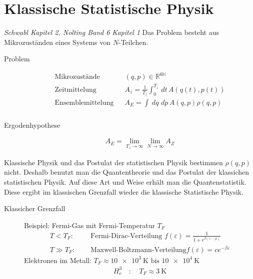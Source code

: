 \documentclass[11pt]{article}
\theoremstyle{plain}
\theoremstyle{mytheoremstyle}
\newcommand{\R}{\mathbb{R}}
\newcommand{\N}{\mathbb{N}}
\renewcommand{\d}[1]{\,d#1\,}
\begin{document}
\section*{Klassische Statistische Physik}
\emph{Schwabl Kapitel 2, Nolting Band 6 Kapitel 1}
Das Problem besteht aus Mikrozust\"anden eines Systems von $N$-Teilchen.
%
\begin{description}
  \item[Problem]
    \begin{align*}
      \text{Mikrozust\"ande } && (q,p) \in \R^{6\N} \\
      \text{Zeitmittelung} && A_z = \frac{1}{T_z} \int_{0}^{T_z} \d{t} A(q(t),p(t)) \\
      \text{Ensemblemittelung} && A_E = \int_{}^{} \d{q}\d{p} A(q,p) \rho(q,p) \\
    \end{align*}
  \item[Ergodenhypothese] %
    \begin{align*}
      A_E = \lim_{T_z\to  \infty} \lim_{N\to  \infty} A_Z
    \end{align*}
\end{description}
Klassische Physik und das Postulat der statistischen Physik bestimmen 
$\rho(q,p)$ nicht. Deshalb benutzt man die Quantentheorie und das Postulat
der klassichen statistischen Physik. Auf diese Art und Weise erh\"alt man
die Quantenstatistik. Diese ergibt im klassischen Grenzfall wieder die
klassische Statistische Physik. 
\begin{description}
  \item[Klassicher Grenzfall] 
    Beispiel: Fermi-Gas mit Fermi-Temperatur $T_F$ \\
      \begin{align*}
        T < T_F:& \quad \text{ Fermi-Dirac-Verteilung } f(\varepsilon)
        = \frac{1}{1 + e^{\beta(\varepsilon - \mu)}} \\
        T \gg T_F: & \quad \text{ Maxwell-Boltzmann-Verteilung} f(\varepsilon)
        = c e^{-\beta \varepsilon}
      \end{align*}
      Elektronen im Metall: $T_F \approx \SI{10e3 }{\kelvin} \text{ bis } \SI{10e4}{\kelvin}$
      \begin{align*}
        H_e^3 \quad: \quad T_F \approx \SI{3}{\kelvin}
      \end{align*}
\end{description}
\end{document}
